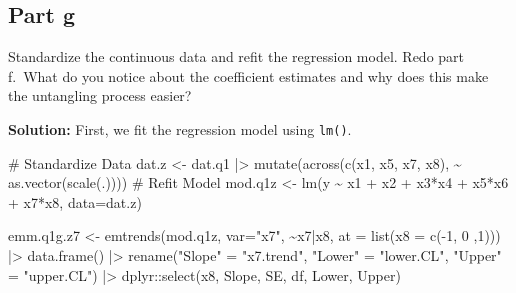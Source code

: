 \documentclass[
]{article}
\newenvironment{Shaded}{\begin{snugshade}}{\end{snugshade}}
\newcommand{\AttributeTok}[1]{\textcolor[rgb]{0.40,0.45,0.13}{#1}}
\newcommand{\CommentTok}[1]{\textcolor[rgb]{0.37,0.37,0.37}{#1}}
\newcommand{\DecValTok}[1]{\textcolor[rgb]{0.68,0.00,0.00}{#1}}
\newcommand{\FunctionTok}[1]{\textcolor[rgb]{0.28,0.35,0.67}{#1}}
\newcommand{\NormalTok}[1]{\textcolor[rgb]{0.00,0.23,0.31}{#1}}
\newcommand{\OtherTok}[1]{\textcolor[rgb]{0.00,0.23,0.31}{#1}}
\newcommand{\SpecialCharTok}[1]{\textcolor[rgb]{0.37,0.37,0.37}{#1}}
\newcommand{\StringTok}[1]{\textcolor[rgb]{0.13,0.47,0.30}{#1}}
\begin{document}
\subsection{Part g}\label{part-g}

Standardize the continuous data and refit the regression model. Redo
part f.~What do you notice about the coefficient estimates and why does
this make the untangling process easier?

\textbf{Solution:} First, we fit the regression model using
\texttt{lm()}.

\scriptsize

\begin{Shaded}
\begin{Highlighting}[numbers=left,,]
\CommentTok{\# Standardize Data}
\NormalTok{dat.z }\OtherTok{\textless{}{-}}\NormalTok{ dat.q1 }\SpecialCharTok{|\textgreater{}}
  \FunctionTok{mutate}\NormalTok{(}\FunctionTok{across}\NormalTok{(}\FunctionTok{c}\NormalTok{(x1, x5, x7, x8), }\SpecialCharTok{\textasciitilde{}} \FunctionTok{as.vector}\NormalTok{(}\FunctionTok{scale}\NormalTok{(.))))}
\CommentTok{\# Refit Model}
\NormalTok{mod.q1z }\OtherTok{\textless{}{-}} \FunctionTok{lm}\NormalTok{(y }\SpecialCharTok{\textasciitilde{}}\NormalTok{ x1 }\SpecialCharTok{+}\NormalTok{ x2 }\SpecialCharTok{+}\NormalTok{ x3}\SpecialCharTok{*}\NormalTok{x4 }\SpecialCharTok{+}\NormalTok{ x5}\SpecialCharTok{*}\NormalTok{x6 }\SpecialCharTok{+}\NormalTok{ x7}\SpecialCharTok{*}\NormalTok{x8, }\AttributeTok{data=}\NormalTok{dat.z)}
\end{Highlighting}
\end{Shaded}

\normalsize

\scriptsize

\begin{Shaded}
\begin{Highlighting}[numbers=left,,]
\NormalTok{emm.q1g.z7 }\OtherTok{\textless{}{-}} \FunctionTok{emtrends}\NormalTok{(mod.q1z, }\AttributeTok{var=}\StringTok{"x7"}\NormalTok{, }\SpecialCharTok{\textasciitilde{}}\NormalTok{x7}\SpecialCharTok{|}\NormalTok{x8,}
                    \AttributeTok{at =} \FunctionTok{list}\NormalTok{(}\AttributeTok{x8 =} \FunctionTok{c}\NormalTok{(}\SpecialCharTok{{-}}\DecValTok{1}\NormalTok{, }\DecValTok{0}\NormalTok{ ,}\DecValTok{1}\NormalTok{))) }\SpecialCharTok{|\textgreater{}}
          \FunctionTok{data.frame}\NormalTok{() }\SpecialCharTok{|\textgreater{}}
          \FunctionTok{rename}\NormalTok{(}\StringTok{"Slope"}  \OtherTok{=} \StringTok{"x7.trend"}\NormalTok{,}
                 \StringTok{"Lower"} \OtherTok{=} \StringTok{"lower.CL"}\NormalTok{,}
                 \StringTok{"Upper"} \OtherTok{=} \StringTok{"upper.CL"}\NormalTok{) }\SpecialCharTok{|\textgreater{}}
\NormalTok{          dplyr}\SpecialCharTok{::}\FunctionTok{select}\NormalTok{(x8, Slope, SE, df, Lower, Upper)}
\end{Highlighting}
\end{Shaded}
\end{document}
